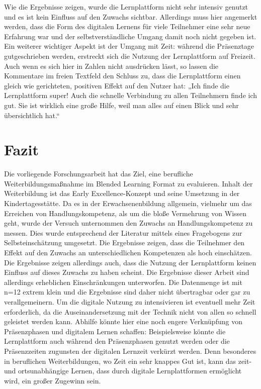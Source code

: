 \documentclass[12pt, bibliography=totoc]{scrartcl}
\begin{document}
Wie die Ergebnisse zeigen, wurde die Lernplattform nicht sehr intensiv
genutzt und es ist kein Einfluss auf den Zuwachs sichtbar. Allerdings
muss hier angemerkt werden, dass die Form des digitalen Lernens für
viele Teilnehmer eine sehr neue Erfahrung war und der
selbstverständliche Umgang damit noch nicht gegeben ist. Ein weiterer
wichtiger Aspekt ist der Umgang mit Zeit: während die Präsenztage
gutgeschrieben werden, erstreckt sich die Nutzung der Lernplattform auf
Freizeit. Auch wenn es sich hier in Zahlen nicht ausdrücken lässt, so
lassen die Kommentare im freien Textfeld den Schluss zu, dass die
Lernplattform einen gleich wie gerichteten, positiven Effekt auf den
Nutzer hat: „Ich finde die Lernplattform super! Auch die schnelle
Verbindung zu allen Teilnehmern finde ich gut. Sie ist wirklich eine
große Hilfe, weil man alles auf einen Blick und sehr übersichtlich
hat.``

\section{Fazit}\label{fazit}

Die vorliegende Forschungsarbeit hat das Ziel, eine berufliche
Weiterbildungsmaßnahme im Blended Learning Format zu evaluieren. Inhalt
der Weiterbildung ist das Early Excellence-Konzept und seine Umsetzung
in der Kindertagesstätte. Da es in der Erwachsenenbildung allgemein,
vielmehr um das Erreichen von Handlungskompetenz, als um die bloße
Vermehrung von Wissen geht, wurde der Versuch unternommen den Zuwachs an
Handlungskompetenz zu messen. Dies wurde entsprechend der Literatur
mittels eines Fragebogens zur Selbsteinschätzung umgesetzt. Die
Ergebnisse zeigen, dass die Teilnehmer den Effekt auf den Zuwachs an
unterschiedlichen Kompetenzen als hoch einschätzen. Die Ergebnisse
zeigen allerdings auch, dass die Nutzung der Lernplattform keinen
Einfluss auf dieses Zuwachs zu haben scheint. Die Ergebnisse dieser
Arbeit sind allerdings erheblichen Einschränkungen unterworfen. Die
Datenmenge ist mit n=12 extrem klein und die Ergebnisse sind daher nicht
übertragbar oder gar zu verallgemeinern. Um die digitale Nutzung zu
intensivieren ist eventuell mehr Zeit erforderlich, da die
Auseinandersetzung mit der Technik nicht von allen so schnell geleistet
werden kann. Abhilfe könnte hier eine noch engere Verknüpfung von
Präsenzphasen und digitalem Lernen schaffen: Beispielsweise könnte die
Lernplattform auch während den Präsenzphasen genutzt werden oder die
Präsenzzeiten zugunsten der digitalen Lernzeit verkürzt werden. Denn
besonderes in beruflichen Weiterbildungen, wo Zeit ein sehr knappes Gut
ist, kann das zeit- und ortsunabhängige Lernen, dass durch digitale
Lernplattformen ermöglicht wird, ein großer Zugewinn sein.
 
\end{document}
